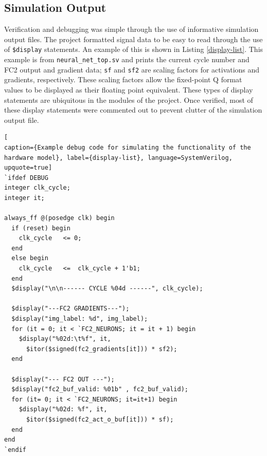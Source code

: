 \subsection{Simulation Output}
Verification and debugging was simple through the use of informative simulation output files. The project formatted signal data to be easy to read through the use of \texttt{\$display} statements. An example of this is shown in Listing \ref{display-list}. This example is from \texttt{neural\_net\_top.sv} and prints the current cycle number and FC2 output and gradient data; \texttt{sf} and \texttt{sf2} are scaling factors for activations and gradients, respectively. These scaling factors allow the fixed-point Q format values to be displayed as their floating point equivalent. These types of display statements are ubiquitous in the modules of the project. Once verified, most of these display statements were commented out to prevent clutter of the simulation output file.
\begin{lstlisting}[
caption={Example debug code for simulating the functionality of the hardware model}, label={display-list}, language=SystemVerilog, upquote=true]
`ifdef DEBUG
integer clk_cycle;
integer it;

always_ff @(posedge clk) begin
  if (reset) begin
    clk_cycle   <= 0;
  end
  else begin
    clk_cycle   <=  clk_cycle + 1'b1;
  end
  $display("\n\n------ CYCLE %04d ------", clk_cycle);
  	
  $display("---FC2 GRADIENTS---");    
  $display("img_label: %d", img_label);    
  for (it = 0; it < `FC2_NEURONS; it = it + 1) begin
    $display("%02d:\t%f", it, 
      $itor($signed(fc2_gradients[it])) * sf2);
  end
  
  $display("--- FC2 OUT ---");        
  $display("fc2_buf_valid: %01b" , fc2_buf_valid);
  for (it= 0; it < `FC2_NEURONS; it=it+1) begin
    $display("%02d: %f", it, 
      $itor($signed(fc2_act_o_buf[it])) * sf); 
  end
end 
`endif    
\end{lstlisting}

